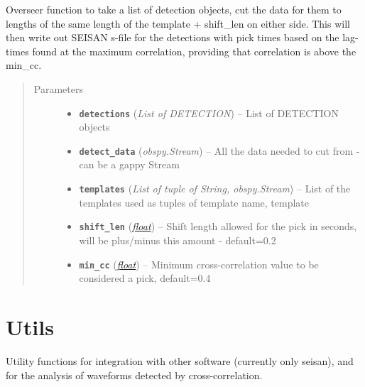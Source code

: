 \documentclass[a4paper,10pt,english]{sphinxmanual}
\begin{document}
\begin{fulllineitems}
\label{submodules/core.lag_calc:lag_calc.lag_calc}
Overseer function to take a list of detection objects, cut the data for
them to lengths of the same length of the template + shift\_len on
either side. This will then write out SEISAN s-file for the detections
with pick times based on the lag-times found at the maximum correlation,
providing that correlation is above the min\_cc.
\begin{quote}\begin{description}
\item[{Parameters}] \leavevmode\begin{itemize}
\item {} 
\textbf{\texttt{detections}} (\emph{List of DETECTION}) -- List of DETECTION objects

\item {} 
\textbf{\texttt{detect\_data}} (\emph{obspy.Stream}) -- All the data needed to cut from - can be a gappy Stream

\item {} 
\textbf{\texttt{templates}} (\emph{List of tuple of String, obspy.Stream}) -- List of the templates used as tuples of template name, template

\item {} 
\textbf{\texttt{shift\_len}} (\href{https://docs.python.org/library/functions.html\#float}{\emph{float}}) -- Shift length allowed for the pick in seconds, will be
plus/minus this amount - default=0.2

\item {} 
\textbf{\texttt{min\_cc}} (\href{https://docs.python.org/library/functions.html\#float}{\emph{float}}) -- Minimum cross-correlation value to be considered a pick,
default=0.4

\end{itemize}

\end{description}\end{quote}

\end{fulllineitems}



\section{Utils}
\label{utils:utils}\label{utils::doc}
Utility functions for integration with other software (currently only seisan),
and for the analysis of waveforms detected by cross-correlation.
\end{document}
